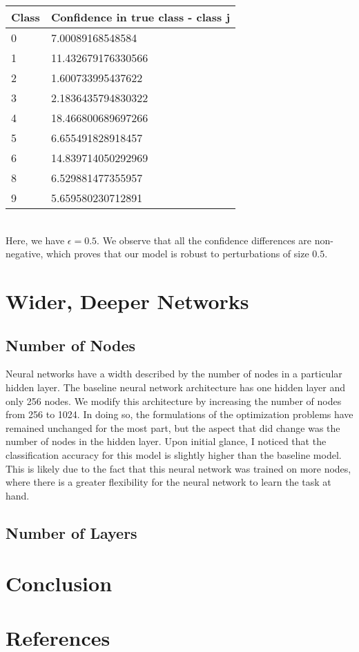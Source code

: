 \documentclass{article}
\begin{document}
\begin{tabular}{|l|l|}
\hline
Class & Confidence in true class - class j \\ \hline
0     & 7.00089168548584                   \\ \hline
1     & 11.432679176330566                 \\ \hline
2     & 1.600733995437622                  \\ \hline
3     & 2.1836435794830322                 \\ \hline
4     & 18.466800689697266                 \\ \hline
5     & 6.655491828918457                  \\ \hline
6     & 14.839714050292969                 \\ \hline
8     & 6.529881477355957                  \\ \hline
9     & 5.659580230712891                  \\ \hline
\end{tabular} \\

Here, we have $\epsilon = 0.5$. We observe that all the confidence differences are non-negative,
which proves that our model is robust to perturbations of size $0.5$.


\section{Wider, Deeper Networks}


\subsection{Number of Nodes}

Neural networks have a width described by the number of nodes in a particular hidden layer. The 
baseline neural network architecture has one hidden layer and only 256 nodes. We modify this
architecture by increasing the number of nodes from 256 to 1024. In doing so, the formulations
of the optimization problems have remained unchanged for the most part, but the aspect that did 
change was the number of nodes in the hidden layer. Upon initial glance, I noticed that the 
classification accuracy for this model is slightly higher than the baseline model. This is likely
due to the fact that this neural network was trained on more nodes, where there is a greater
flexibility for the neural network to learn the task at hand. 



\subsection{Number of Layers}





\section{Conclusion}




\section{References}



\pagebreak

\printbibliography
\end{document}
